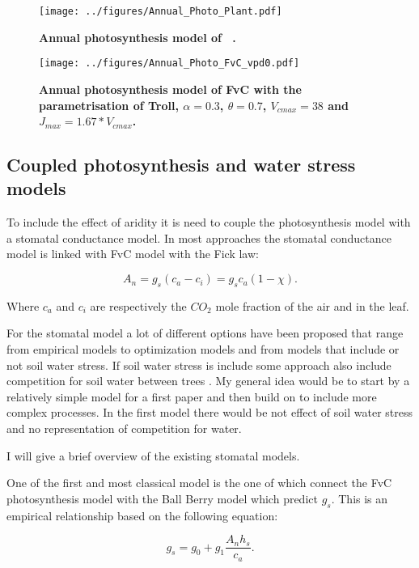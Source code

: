 \documentclass[a4paper,11pt]{article}
\begin{document}
\begin{figure}[ht]
\centering
\texttt{[image: ../figures/Annual\_Photo\_Plant.pdf]}
\caption{\textbf{Annual photosynthesis model of \plant\ .}
\label{fig:photo_annu_plant}}
\end{figure}


\begin{figure}[ht]
\centering
\texttt{[image: ../figures/Annual\_Photo\_FvC\_vpd0.pdf]}
\caption{\textbf{Annual photosynthesis model of FvC with the parametrisation of Troll, $\alpha = 0.3$, $\theta = 0.7$, $V_{cmax} = 38$ and $J_{max} = 1.67 * V_{cmax}$.}
\label{fig:photo_annu_fvc}}
\end{figure}

\clearpage

\subsection{Coupled photosynthesis and water stress models}

To include the effect of aridity it is need to couple the photosynthesis model with a stomatal conductance model. In most approaches the stomatal conductance model is linked with FvC model with the Fick law:

\begin{equation}
\label{eq:fick}
A_n = g_s (c_a - c_i) = g_s c_a (1-\chi).
\end{equation}

Where $c_a$ and $c_i$ are respectively the $CO_2$ mole fraction of the air and in the leaf.


For the stomatal model a lot of different options have been proposed that range from empirical models to optimization models and from models that include or not soil water stress. If soil water stress is include some approach also include competition for soil water between trees \citep{Farrior-2013}. My general idea would be to start by a relatively simple model for a first paper and then build on to include more complex processes. In the first model there would be not effect of soil water stress and no representation of competition for water.

I will give a brief overview of the existing stomatal models.

One of the first and most classical model is the one of \citet{Collatz-1991} which connect the FvC photosynthesis model with the Ball Berry model which predict $g_s$. This is an empirical relationship based on the following equation:

\begin{equation}
\label{eq:gs-Ball}
g_s= g_0 + g_1 \frac{A_n h_s}{c_a}.
\end{equation}
\end{document}

